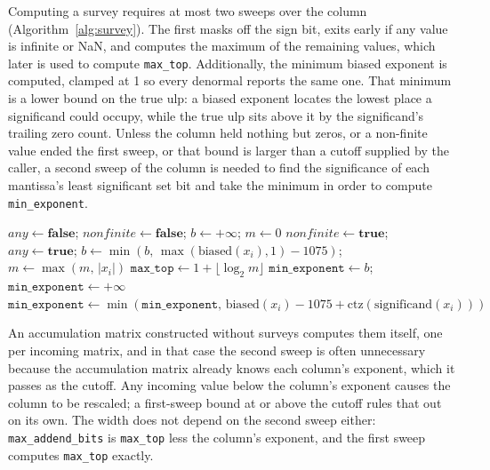 \documentclass[acmsmall,screen,review]{acmart}
\newcommand{\code}[1]{\texttt{#1}}
\begin{document}
Computing a survey requires at most two sweeps over the column (Algorithm~\ref{alg:survey}). The first masks off the sign bit, exits early if any value is infinite or NaN, and computes the maximum of the remaining values, which later is used to compute \code{max\_top}. Additionally, the minimum biased exponent is computed, clamped at 1 so every denormal reports the same one. That minimum is a lower bound on the true ulp: a biased exponent locates the lowest place a significand could occupy, while the true ulp sits above it by the significand's trailing zero count. Unless the column held nothing but zeros, or a non-finite value ended the first sweep, or that bound is larger than a cutoff supplied by the caller, a second sweep of the column is needed to find the significance of each mantissa's least significant set bit and take the minimum in order to compute \code{min\_exponent}.

\begin{algorithm}[t]
\caption{Survey of one column $x_1,\ldots,x_n$ of \code{double}s, given a cutoff $c$}
\label{alg:survey}
\begin{algorithmic}[1]
\State $\mathit{any} \gets \textbf{false}$;\; $\mathit{nonfinite} \gets \textbf{false}$;\; $b \gets +\infty$;\; $m \gets 0$
 
   $\mathit{nonfinite} \gets \textbf{true}$; \Return \EndIf
    \State $\mathit{any} \gets \textbf{true}$;\; $b \gets \min(b,\, \max(\mathrm{biased}(x_i), 1) - 1075)$;\; $m \gets \max(m,\, |x_i|)$
  \EndIf
\EndFor
{} \Return \EndIf
\State $\code{max\_top} \gets 1 + \lfloor \log_2 m \rfloor$ 
 $\code{min\_exponent} \gets b$; \Return {} \EndIf
\State $\code{min\_exponent} \gets +\infty$
 
  \State $\code{min\_exponent} \gets \min(\code{min\_exponent},\, \mathrm{biased}(x_i) - 1075 + \mathrm{ctz}(\mathrm{significand}(x_i)))$
\EndFor
\end{algorithmic}
\end{algorithm}

An accumulation matrix constructed without surveys computes them itself, one per incoming matrix, and in that case the second sweep is often unnecessary because the accumulation matrix already knows each column's exponent, which it passes as the cutoff. Any incoming value below the column's exponent causes the column to be rescaled; a first-sweep bound at or above the cutoff rules that out on its own. The width does not depend on the second sweep either: \code{max\_addend\_bits} is \code{max\_top} less the column's exponent, and the first sweep computes \code{max\_top} exactly.
\end{document}
